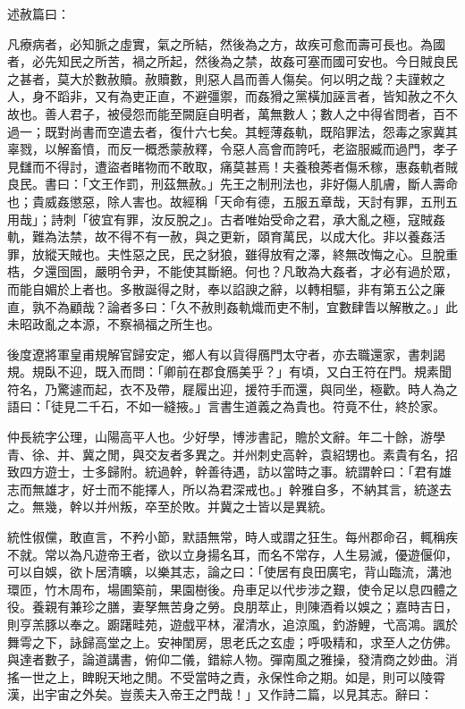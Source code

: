 \begin{pinyinscope}
述赦篇曰：

凡療病者，必知脈之虛實，氣之所結，然後為之方，故疾可愈而壽可長也。為國者，必先知民之所苦，禍之所起，然後為之禁，故姦可塞而國可安也。今日賊良民之甚者，莫大於數赦贖。赦贖數，則惡人昌而善人傷矣。何以明之哉？夫謹敕之人，身不蹈非，又有為吏正直，不避彊禦，而姦猾之黨橫加誣言者，皆知赦之不久故也。善人君子，被侵怨而能至闕庭自明者，萬無數人；數人之中得省問者，百不過一；既對尚書而空遣去者，復什六七矣。其輕薄姦軌，既陷罪法，怨毒之家冀其辜戮，以解畜憤，而反一概悉蒙赦釋，令惡人高會而誇吒，老盜服臧而過門，孝子見讎而不得討，遭盜者睹物而不敢取，痛莫甚焉！夫養稂莠者傷禾稼，惠姦軌者賊良民。書曰：「文王作罰，刑茲無赦。」先王之制刑法也，非好傷人肌膚，斷人壽命也；貴威姦懲惡，除人害也。故經稱「天命有德，五服五章哉，天討有罪，五刑五用哉」；詩刺「彼宜有罪，汝反脫之」。古者唯始受命之君，承大亂之極，寇賊姦軌，難為法禁，故不得不有一赦，與之更新，頤育萬民，以成大化。非以養姦活罪，放縱天賊也。夫性惡之民，民之豺狼，雖得放宥之澤，終無改悔之心。旦脫重梏，夕還囹圄，嚴明令尹，不能使其斷絕。何也？凡敢為大姦者，才必有過於眾，而能自媚於上者也。多散誕得之財，奉以諂諛之辭，以轉相驅，非有第五公之廉直，孰不為顧哉？論者多曰：「久不赦則姦軌熾而吏不制，宜數肆眚以解散之。」此未昭政亂之本源，不察禍福之所生也。

後度遼將軍皇甫規解官歸安定，鄉人有以貨得鴈門太守者，亦去職還家，書刺謁規。規臥不迎，既入而問：「卿前在郡食鴈美乎？」有頃，又白王符在門。規素聞符名，乃驚遽而起，衣不及帶，屣履出迎，援符手而還，與同坐，極歡。時人為之語曰：「徒見二千石，不如一縫掖。」言書生道義之為貴也。符竟不仕，終於家。

仲長統字公理，山陽高平人也。少好學，博涉書記，贍於文辭。年二十餘，游學青、徐、并、冀之閒，與交友者多異之。并州刺史高幹，袁紹甥也。素貴有名，招致四方遊士，士多歸附。統過幹，幹善待遇，訪以當時之事。統謂幹曰：「君有雄志而無雄才，好士而不能擇人，所以為君深戒也。」幹雅自多，不納其言，統遂去之。無幾，幹以并州叛，卒至於敗。并冀之士皆以是異統。

統性俶儻，敢直言，不矜小節，默語無常，時人或謂之狂生。每州郡命召，輒稱疾不就。常以為凡遊帝王者，欲以立身揚名耳，而名不常存，人生易滅，優遊偃仰，可以自娛，欲卜居清曠，以樂其志，論之曰：「使居有良田廣宅，背山臨流，溝池環匝，竹木周布，場圃築前，果園樹後。舟車足以代步涉之艱，使令足以息四體之役。養親有兼珍之膳，妻孥無苦身之勞。良朋萃止，則陳酒肴以娛之；嘉時吉日，則亨羔豚以奉之。躕躇畦苑，遊戲平林，濯清水，追涼風，釣游鯉，弋高鴻。諷於舞雩之下，詠歸高堂之上。安神閨房，思老氏之玄虛；呼吸精和，求至人之仿佛。與達者數子，論道講書，俯仰二儀，錯綜人物。彈南風之雅操，發清商之妙曲。消搖一世之上，睥睨天地之閒。不受當時之責，永保性命之期。如是，則可以陵霄漢，出宇宙之外矣。豈羨夫入帝王之門哉！」又作詩二篇，以見其志。辭曰：


\end{pinyinscope}
